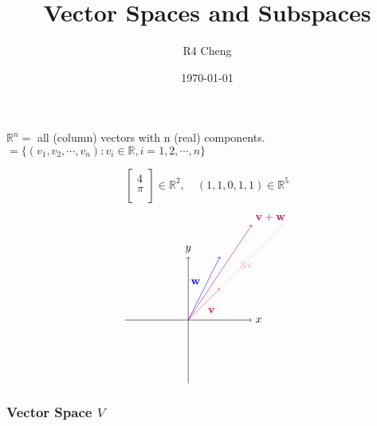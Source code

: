 \documentclass[12pt,a4paper]{article}
\title{Vector Spaces and Subspaces}
\author{R4 Cheng}
\date{\today}
\begin{document}
\maketitle

$\mathbb{R}^n = $ all (column) vectors with n (real) components. \\
$= \{ (v_1, v_2, \cdots, v_n): v_i \in \mathbb{R}, i = 1, 2, \cdots, n \}$

\[
\begin{bmatrix}
  4 \\
  \pi \\
\end{bmatrix} \in \mathbb{R}^2,
\quad
(1, 1, 0, 1, 1) \in \mathbb{R}^5
\]
\[
\begin{tikzpicture}
  \draw[->] (-2, 0) -- (2, 0) node[right] {$x$};
  \draw[->] (0, -2) -- (0, 2) node[above] {$y$};
  
  \draw[->, red] (0, 0) -- (1, 1) node[midway, below right] {$\mathbf{v}$};
  \draw[->, pink] (0, 0) -- (3, 3) node[midway, above right] {$\mathbf{3v}$};
  
  \draw[->, blue] (0, 0) -- (1, 2) node[midway, above left] {$\mathbf{w}$};
  
  \draw[->, purple] (0, 0) -- (2, 3) node[above right] {$\mathbf{v} + \mathbf{w}$};
\end{tikzpicture}
\]

\subsubsection*{Vector Space $V$}
\end{document}
